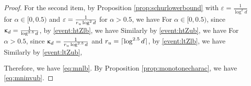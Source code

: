 \begin{proof}
For the second item,   by Proposition \ref{prop:schurlowerbound} with  $\varepsilon = \tfrac{1}{\log^2 d}$ for $\alpha \in [0,0.5)$ and $\varepsilon = \tfrac{1}{r_u \log^2 d}$ for  $\alpha> 0.5$, we have
For   $\alpha \in [0,0.5)$,  since  $\upkappa_d = \tfrac{1}{\log^{3.5} d}$,  by \ref{event:htZlb}, we have 
Similarly  by  \ref{event:htZub},  we have 
For   $\alpha > 0.5$,  since $\upkappa_d = \tfrac{1}{r_u  \log^{2.5} d}$ and $r_u = \lceil\log^{2.5} d\rceil $,  by \ref{event:ltZlb},  we have 
Similarly  by  \ref{event:ltZub},

Therefore,  we have   \eqref{eq:mnlb}.   By Proposition \ref{prop:monotonecharac}, we have  \eqref{eq:mninvub}.


\end{proof}
